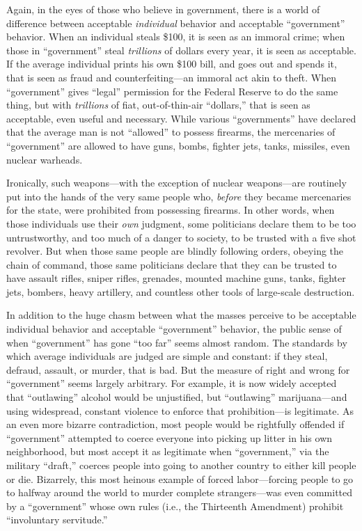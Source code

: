 \documentclass{book}
\begin{document}
Again, in the eyes of those who believe in government, there is a world of difference between acceptable \emph{individual} behavior and acceptable \enquote{government} behavior. When an individual steals \$100, it is seen as an immoral crime; when those in \enquote{government} steal \emph{trillions} of dollars every year, it is seen as acceptable. If the average individual prints his own \$100 bill, and goes out and spends it, that is seen as fraud and counterfeiting---an immoral act akin to theft. When \enquote{government} gives \enquote{legal} permission for the Federal Reserve to do the same thing, but with \emph{trillions} of fiat, out-of-thin-air \enquote{dollars,} that is seen as acceptable, even useful and necessary. While various \enquote{governments} have declared that the average man is not \enquote{allowed} to possess firearms, the mercenaries of \enquote{government} are allowed to have guns, bombs, fighter jets, tanks, missiles, even nuclear warheads.

Ironically, such weapons---with the exception of nuclear weapons---are routinely put into the hands of the very same people who, \emph{before} they became mercenaries for the state, were prohibited from possessing firearms. In other words, when those individuals use their \emph{own} judgment, some politicians declare them to be too untrustworthy, and too much of a danger to society, to be trusted with a five shot revolver. But when those same people are blindly following orders, obeying the chain of command, those same politicians declare that they can be trusted to have assault rifles, sniper rifles, grenades, mounted machine guns, tanks, fighter jets, bombers, heavy artillery, and countless other tools of large-scale destruction.

In addition to the huge chasm between what the masses perceive to be acceptable individual behavior and acceptable \enquote{government} behavior, the public sense of when \enquote{government} has gone \enquote{too far} seems almost random. The standards by which average individuals are judged are simple and constant: if they steal, defraud, assault, or murder, that is bad. But the measure of right and wrong for \enquote{government} seems largely arbitrary. For example, it is now widely accepted that \enquote{outlawing} alcohol would be unjustified, but \enquote{outlawing} marijuana---and using widespread, constant violence to enforce that prohibition---is legitimate. As an even more bizarre contradiction, most people would be rightfully offended if \enquote{government} attempted to coerce everyone into picking up litter in his own neighborhood, but most accept it as legitimate when \enquote{government,} via the military \enquote{draft,} coerces people into going to another country to either kill people or die. Bizarrely, this most heinous example of forced labor---forcing people to go to halfway around the world to murder complete strangers---was even committed by a \enquote{government} whose own rules (i.e., the Thirteenth Amendment) prohibit \enquote{involuntary servitude.}
\end{document}

